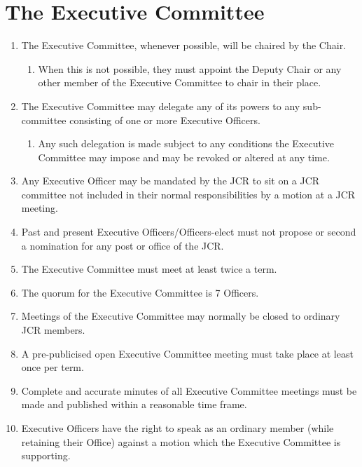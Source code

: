 \documentclass[12pt]{article}
\begin{document}
\newpage

\section{The Executive Committee}
\begin{enumerate}
    \item The Executive Committee, whenever possible, will be chaired by the Chair.
    \begin{enumerate}
        \item When this is not possible, they must appoint the Deputy Chair or any other member of the Executive Committee to chair in their place.
    \end{enumerate}
    \item The Executive Committee may delegate any of its powers to any sub-committee consisting of one or more Executive Officers.
    \begin{enumerate}
        \item Any such delegation is made subject to any conditions the Executive Committee may impose and may be revoked or altered at any time.
    \end{enumerate}
    \item Any Executive Officer may be mandated by the JCR to sit on a JCR committee not included in their normal responsibilities by a motion at a JCR meeting.
    \item Past and present Executive Officers/Officers-elect must not propose or second a nomination for any post or office of the JCR.
    \item The Executive Committee must meet at least twice a term.
    \item The quorum for the Executive Committee is 7 Officers.
    \item Meetings of the Executive Committee may normally be closed to ordinary JCR members.
    \item A pre-publicised open Executive Committee meeting must take place at least once per term.
    \item Complete and accurate minutes of all Executive Committee meetings must be made and published within a reasonable time frame.
    \item Executive Officers have the right to speak as an ordinary member (while retaining their Office) against a motion which the Executive Committee is supporting.
\end{enumerate}
\newpage
\end{document}
